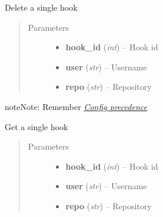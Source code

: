 \documentclass[letterpaper,10pt,english]{sphinxmanual}
\begin{document}
\begin{fulllineitems}
\begin{fulllineitems}
\end{fulllineitems}


\begin{fulllineitems}
\label{repos:pygithub3.services.repos.Hooks.delete}
Delete a single hook
\begin{quote}\begin{description}
\item[{Parameters}] \leavevmode\begin{itemize}
\item {} 
\textbf{hook\_id} (\emph{int}) -- Hook id

\item {} 
\textbf{user} (\emph{str}) -- Username

\item {} 
\textbf{repo} (\emph{str}) -- Repository

\end{itemize}

\end{description}\end{quote}

\begin{notice}{note}{Note:}
Remember {\hyperref[repos:config-precedence]{\emph{Config precedence}}}
\end{notice}

\end{fulllineitems}


\begin{fulllineitems}
\label{repos:pygithub3.services.repos.Hooks.get}
Get a single hook
\begin{quote}\begin{description}
\item[{Parameters}] \leavevmode\begin{itemize}
\item {} 
\textbf{hook\_id} (\emph{int}) -- Hook id

\item {} 
\textbf{user} (\emph{str}) -- Username

\item {} 
\textbf{repo} (\emph{str}) -- Repository


\end{itemize}
\end{description}
\end{quote}
\end{fulllineitems}
\end{fulllineitems}
\end{document}
